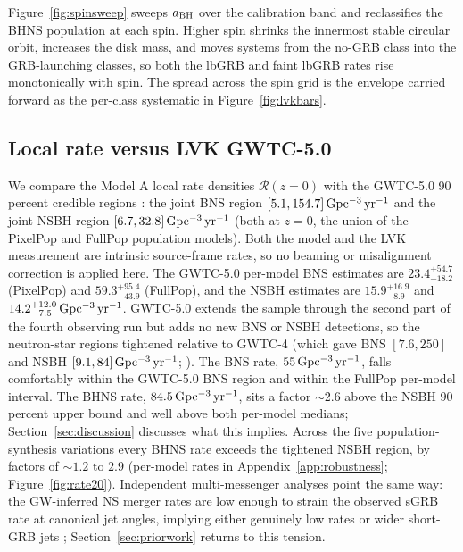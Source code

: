 \documentclass[twocolumn,amsmath]{aastex702}
\newcommand{\Rzero}{\mathcal{R}(z{=}0)}
\newcommand{\aBH}{a_{\rm BH}}
\newcommand{\Gpcyr}{{\rm Gpc^{-3}\,yr^{-1}}}
\begin{document}
Figure~\ref{fig:spinsweep} sweeps $\aBH$ over the \citet{foucart2018}
calibration band and reclassifies the BHNS population at each spin. Higher spin
shrinks the innermost stable circular orbit, increases the disk mass, and moves
systems from the no-GRB class into the GRB-launching classes, so both the lbGRB
and faint lbGRB rates rise monotonically with spin. The spread across the spin
grid is the envelope carried forward as the per-class systematic in
Figure~\ref{fig:lvkbars}.

\subsection{Local rate versus LVK GWTC-5.0} \label{sec:lvk}

We compare the Model A local rate densities $\Rzero$ with the
GWTC-5.0 90 percent credible regions \citep{abac2026}: the joint BNS region
$[5.1, 154.7]\,\Gpcyr$ and the joint NSBH region $[6.7, 32.8]\,\Gpcyr$ (both at
$z = 0$, the union of the PixelPop and FullPop population models). Both the model
and the LVK measurement are intrinsic source-frame rates, so no beaming or
misalignment correction is applied here. The GWTC-5.0 per-model BNS estimates are
$23.4^{+54.7}_{-18.2}$ (PixelPop) and $59.3^{+95.4}_{-43.9}$ (FullPop), and the NSBH
estimates are $15.9^{+16.9}_{-8.9}$ and
$14.2^{+12.0}_{-7.5}\,\Gpcyr$. GWTC-5.0 extends the sample through the second part
of the fourth observing run but adds no new BNS or NSBH detections, so the
neutron-star regions tightened relative to GWTC-4 (which gave BNS
$[7.6, 250]$ and NSBH $[9.1, 84]\,\Gpcyr$; \citealt{abac2025}). The BNS rate,
$55\,\Gpcyr$, falls comfortably within the GWTC-5.0 BNS region and within the
FullPop per-model interval. The BHNS rate, $84.5\,\Gpcyr$, sits a factor
$\sim 2.6$ above the NSBH 90 percent upper bound and well above both per-model
medians; Section~\ref{sec:discussion} discusses what this implies. Across the
five population-synthesis variations every BHNS rate exceeds the tightened
NSBH region, by factors of $\sim 1.2$ to $2.9$ (per-model rates in
Appendix~\ref{app:robustness}; Figure~\ref{fig:rate20}). Independent
multi-messenger analyses point the same way: the GW-inferred NS merger rates
are low enough to strain the observed sGRB rate at canonical jet angles,
implying either genuinely low rates \citep{fishbach2026,jin2026} or wider
short-GRB jets \citep{kunnumkai2026}; Section~\ref{sec:priorwork} returns to
this tension.
\end{document}
